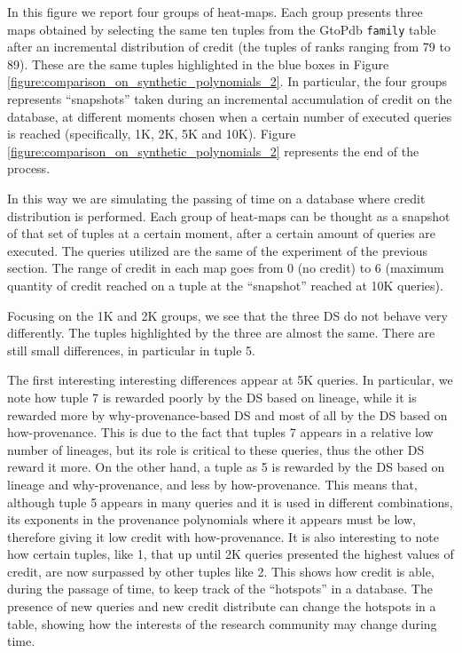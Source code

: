 In this figure we report four groups of heat-maps. Each group presents three maps obtained by selecting the same ten tuples from the GtoPdb \texttt{family} table after an incremental distribution of credit (the tuples of ranks ranging from 79 to 89). These are the same tuples highlighted in the blue boxes in Figure \ref{figure:comparison_on_synthetic_polynomials_2}.  In particular, the four groups represents ``snapshots'' taken during an incremental accumulation of credit on the database, at different moments chosen when a certain number of executed queries is reached (specifically, 1K, 2K, 5K and 10K).
Figure \ref{figure:comparison_on_synthetic_polynomials_2} represents the end of the process. 

In this way we are simulating the passing of time on a database where credit distribution is performed. Each group of heat-maps can be thought as a snapshot of that set of tuples at a certain moment, after a certain amount of queries are executed. 
The queries utilized are the same of the experiment of the previous section. The range of credit in each map goes from 0 (no credit) to 6 (maximum quantity of credit reached on a tuple at the ``snapshot'' reached at 10K queries).

Focusing on the 1K and 2K groups, we see that the three DS do not behave very differently. The tuples highlighted by the three are almost the same. There are still small differences, in particular in tuple 5.

The first interesting interesting differences appear at 5K queries. In particular, we note how tuple 7 is rewarded poorly by the DS based on lineage, while it is rewarded more by why-provenance-based DS and most of all by the DS based on how-provenance. This is due to the fact that tuples 7 appears in a relative low number of lineages, but its role is critical to these queries, thus the other DS reward it more.
On the other hand, a tuple as 5 is rewarded by the DS based on lineage and why-provenance, and less by how-provenance. This means that, although tuple 5 appears in many queries and it is used in different combinations, its exponents in the provenance polynomials where it appears must be low, therefore giving it low credit with how-provenance.
It is also interesting to note how certain tuples, like 1, that up until 2K queries presented the highest values of credit, are now surpassed by other tuples like 2. This shows how credit is able, during the passage of time, to keep track of the ``hotspots'' in a database. The presence of new queries and new credit distribute can change the hotspots in a table, showing how the interests of the research community may change during time. 

